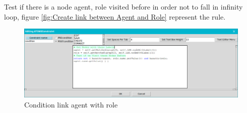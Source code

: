 Test if there is a node agent, role visited before 
in order not to fall in infinity loop, figure \ref{fig:Create link between Agent and Role} represent the rule.
 
\begin{figure}[th]
	\centering
 	\includegraphics[scale=0.37]{ch3/img/condrule1}
	\caption{\label{fig:Condition link agent with role}Condition link agent with role }
\end{figure} 

